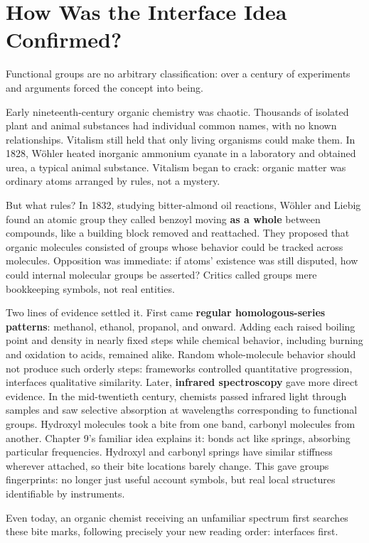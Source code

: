 \section{How Was the Interface Idea Confirmed?}

\begin{zhengju}
Functional groups are no arbitrary classification: over a century of experiments and arguments forced the concept into being.

Early nineteenth-century organic chemistry was chaotic. Thousands of isolated plant and animal substances had individual common names, with no known relationships. Vitalism still held that only living organisms could make them. In 1828, Wöhler heated inorganic ammonium cyanate in a laboratory and obtained urea, a typical animal substance. Vitalism began to crack: organic matter was ordinary atoms arranged by rules, not a mystery.

But what rules? In 1832, studying bitter-almond oil reactions, Wöhler and Liebig found an atomic group they called benzoyl moving \textbf{as a whole} between compounds, like a building block removed and reattached. They proposed that organic molecules consisted of groups whose behavior could be tracked across molecules. Opposition was immediate: if atoms' existence was still disputed, how could internal molecular groups be asserted? Critics called groups mere bookkeeping symbols, not real entities.

Two lines of evidence settled it. First came \textbf{regular homologous-series patterns}: methanol, ethanol, propanol, and onward. Adding each  raised boiling point and density in nearly fixed steps while chemical behavior, including burning and oxidation to acids, remained alike. Random whole-molecule behavior should not produce such orderly steps: frameworks controlled quantitative progression, interfaces qualitative similarity. Later, \textbf{infrared spectroscopy} gave more direct evidence. In the mid-twentieth century, chemists passed infrared light through samples and saw selective absorption at wavelengths corresponding to functional groups. Hydroxyl molecules took a bite from one band, carbonyl molecules from another. Chapter 9's familiar idea explains it: bonds act like springs, absorbing particular frequencies. Hydroxyl and carbonyl springs have similar stiffness wherever attached, so their bite locations barely change. This gave groups fingerprints: no longer just useful account symbols, but real local structures identifiable by instruments.

Even today, an organic chemist receiving an unfamiliar spectrum first searches these bite marks, following precisely your new reading order: interfaces first.
\end{zhengju}

